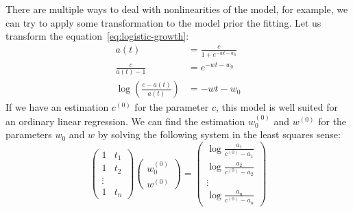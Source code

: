 \documentclass[notitlepage,oneside]{book}
\begin{document}
There are multiple ways to deal with nonlinearities of the model, for example, we can try to apply some transformation to the model prior the fitting.
Let us transform the equation~\eqref{eq:logistic-growth}:
\begin{align*}
a(t) &= \frac{c}{1+e^{-wt - w_0}} \\
\frac{c}{a(t)-1} & = e^{-wt-w_0}  \\
\log\left(\frac{c-a(t)}{a(t)}\right) & = -wt-w_0
\end{align*}
If we have an estimation $c^{(0)}$ for the parameter $c$, this model is well suited for an ordinary linear regression.
We can find the estimation $w_0^{(0)}$ and $w^{(0)}$ for the parameters $w_0$ and $w$ by solving the following system in the least squares sense:
\begin{equation}
\label{eq:logistic-initial-guess}
\begin{pmatrix}
1 & t_1 \\
1 & t_2 \\
\vdots & \\
1 & t_n
\end{pmatrix}
\begin{pmatrix}
w^{(0)}_0\\
w^{(0)}
\end{pmatrix}
=
\begin{pmatrix}
\log\frac{a_1}{c^{(0)} - a_1}\\
\log\frac{a_2}{c^{(0)} - a_2}\\
\vdots \\
\log\frac{a_n}{c^{(0)} - a_n}
\end{pmatrix}
\end{equation}
\end{document}
